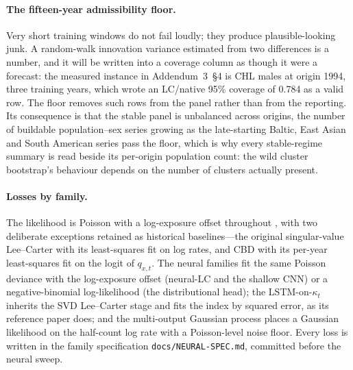 \paragraph{The fifteen-year admissibility floor.} Very short training windows
do not fail loudly; they produce plausible-looking junk. A random-walk
innovation variance estimated from two differences is a number, and it will be
written into a coverage column as though it were a forecast: the measured
instance in Addendum~3~\S4 is CHL males at origin 1994, three training years,
which wrote an LC/native 95\% coverage of 0.784 as a valid row. The floor
removes such rows from the panel rather than from the reporting. Its
consequence is that the stable panel is unbalanced across origins, the number
of buildable population--sex series growing as the late-starting Baltic, East
Asian and South American series pass the floor, which is why every
stable-regime summary is read beside its per-origin population count: the wild
cluster bootstrap's behaviour depends on the number of clusters actually
present.

\paragraph{Losses by family.} The likelihood is Poisson with a log-exposure
offset throughout \citep{brouhns2002poisson}, with two deliberate exceptions
retained as historical baselines---the original singular-value Lee--Carter
with its least-squares fit on log rates, and CBD with its per-year
least-squares fit on the logit of $q_{x,t}$. The neural families fit the same
Poisson deviance with the log-exposure offset (neural-LC and the shallow CNN)
or a negative-binomial log-likelihood (the distributional head); the
LSTM-on-$\kappa_t$ inherits the SVD Lee--Carter stage and fits the index by
squared error, as its reference paper does; and the multi-output Gaussian
process places a Gaussian likelihood on the half-count log rate with a
Poisson-level noise floor. Every loss is written in the family specification
\texttt{docs/NEURAL-SPEC.md}, committed before the neural sweep.

